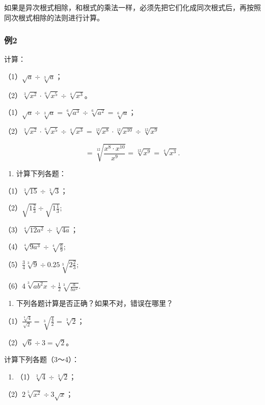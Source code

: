 如果是异次根式相除，和根式的乘法一样，必须先把它们化成同次根式后，再按照同次根式相除的法则进行计算。

\subsubsection{例2}

计算：

（1）\(\sqrt{a} \div \sqrt[3]{a}\)；

（2）\(\sqrt[3]{x^2} \cdot \sqrt[6]{x^5} \div \sqrt[4]{x^3}\)。

（1）\(\sqrt{a} \div \sqrt[3]{a} = \sqrt[6]{a^3} \div \sqrt[6]{a^2} = \sqrt[6]{a}\)；

（2）\(\sqrt[3]{x^2} \cdot \sqrt[6]{x^5} \div \sqrt[4]{x^3} = \sqrt[12]{x^8} \cdot \sqrt[12]{x^{10}} \div \sqrt[12]{x^9}\)

\[
= \sqrt[12]{\frac{x^8\cdot x^{10}}{x^9}} = \sqrt[12]{x^9} = \sqrt[4]{x^3}.
\]

\begin{enumerate}
\item
  计算下列各题：
\end{enumerate}

（1）\(\sqrt[3]{15} \div \sqrt[3]{3}\)；

（2）\(\sqrt{1\frac{2}{3}}\div \sqrt{1\frac{1}{3}};\)

（3）\(\sqrt[4]{12a^2} \div \sqrt[3]{4a}\)；

（4）\(\sqrt[4]{9a^3} \div \sqrt[4]{\frac{a}{9}};\)

（5）\(\frac{3}{4}\sqrt[3]{9} \div 0.25\sqrt[3]{2\frac{2}{3}};\)

（6）\(4\sqrt[3]{ab^2x} \div \frac{1}{2}\sqrt[3]{\frac{a}{bx^2}}.\)

\begin{enumerate}[start=2]
\item
  下列各题计算是否正确？如果不对，错误在哪里？
\end{enumerate}

（1）\(\frac{\sqrt[8]{4}}{\sqrt{2}} = \sqrt[3]{\frac{4}{2}} = \sqrt[3]{2}\)；

（2）\(\sqrt{6} \div 3 = \sqrt{2}\)。

计算下列各题（3～4）：

\begin{enumerate}[start=3]
\item
  （1）\(\sqrt[3]{4} \div \sqrt[3]{2}\)；
\end{enumerate}

（2）\(2\sqrt[5]{x^2} \div 3\sqrt{x}\)；

